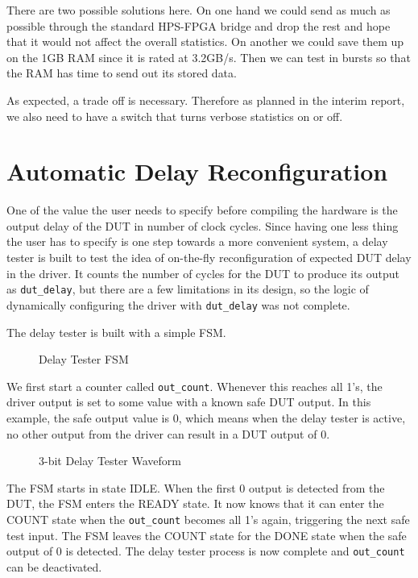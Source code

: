There are two possible solutions here.
On one hand we could send as much as possible through the standard HPS-FPGA bridge and drop the rest and hope that it would not affect the overall statistics.
On another we could save them up on the 1GB RAM since it is rated at 3.2GB/s.
Then we can test in bursts so that the RAM has time to send out its stored data.

As expected, a trade off is necessary.
Therefore as planned in the interim report, we also need to have a switch that turns verbose statistics on or off.

\section{Automatic Delay Reconfiguration}
One of the value the user needs to specify before compiling the hardware is the output delay of the DUT in number of clock cycles.
Since having one less thing the user has to specify is one step towards a more convenient system, a delay tester is built to test the idea of on-the-fly reconfiguration of expected DUT delay in the driver.
It counts the number of cycles for the DUT to produce its output as \texttt{dut\_delay}, but there are a few limitations in its design, so the logic of dynamically configuring the driver with \texttt{dut\_delay} was not complete.

The delay tester is built with a simple FSM.

\begin{figure}[H]
  \centering
  
  \caption{Delay Tester FSM}
  \label{DelayTesterFSM}
\end{figure}

We first start a counter called \texttt{out\_count}.
Whenever this reaches all 1's, the driver output is set to some value with a known safe DUT output.
In this example, the safe output value is 0, which means when the delay tester is active, no other output from the driver can result in a DUT output of 0.

\begin{figure}[H]
  \centering
  
  \caption{3-bit Delay Tester Waveform}
  \label{DelayTesterWF}
\end{figure}

The FSM starts in state IDLE.
When the first 0 output is detected from the DUT, the FSM enters the READY state.
It now knows that it can enter the COUNT state when the \texttt{out\_count} becomes all 1's again, triggering the next safe test input.
The FSM leaves the COUNT state for the DONE state when the safe output of 0 is detected.
The delay tester process is now complete and \texttt{out\_count} can be deactivated.

